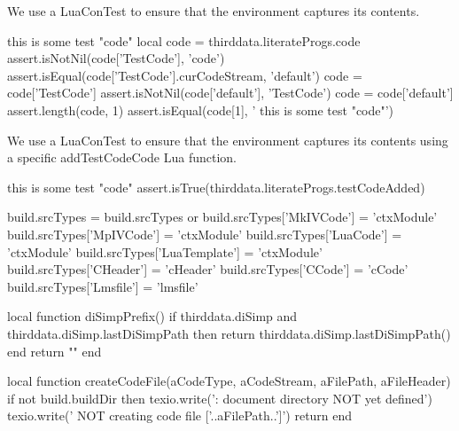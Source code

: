 \def\addMITLicense#1#2#3{
  \directlua{
    thirddata.literateProgs.addMITLicense('#1', '#2', '#3')
  }
}

\def\addApacheLicense#1#2#3{
  \directlua{
    thirddata.literateProgs.addApacheLicense('#1', '#2', '#3')
  }
}
\stopMkIVCode


We use a LuaConTest to ensure that the  environment 
captures its contents. 

\startConTest
\begingroup
  \startTestCode
    this is some test "code"
  \stopTestCode
  \startLuaConTest
    local code = thirddata.literateProgs.code
    assert.isNotNil(code['TestCode'], 'code')
    assert.isEqual(code['TestCode'].curCodeStream, 'default')
    code = code['TestCode']
    assert.isNotNil(code['default'], 'TestCode')
    code = code['default']
    assert.length(code, 1)
    assert.isEqual(code[1], '    this is some test "code"')
  \stopLuaConTest
\endgroup
\stopConTest
\stopTestCase


We use a LuaConTest to ensure that the  environment 
captures its contents using a specific addTestCodeCode Lua function. 

\startConTest
\begingroup
  \startTestCode
    this is some test "code"
  \stopTestCode
  \startLuaConTest
    assert.isTrue(thirddata.literateProgs.testCodeAdded)
  \stopLuaConTest
\endgroup
\stopConTest
\stopTestCase

\startLuaCode

build.srcTypes = build.srcTypes or { }
build.srcTypes['MkIVCode']    = 'ctxModule'
build.srcTypes['MpIVCode']    = 'ctxModule'
build.srcTypes['LuaCode']     = 'ctxModule'
build.srcTypes['LuaTemplate'] = 'ctxModule'
build.srcTypes['CHeader']     = 'cHeader'
build.srcTypes['CCode']       = 'cCode'
build.srcTypes['Lmsfile']     = 'lmsfile'

local function diSimpPrefix()
  if thirddata.diSimp and thirddata.diSimp.lastDiSimpPath then
    return thirddata.diSimp.lastDiSimpPath()
  end
  return ""
end

local function createCodeFile(aCodeType,
                              aCodeStream,
                              aFilePath,
                              aFileHeader)
  if not build.buildDir then
    texio.write('\nERROR: document directory NOT yet defined\n')
    texio.write('       NOT creating code file ['..aFilePath..']\n\n')
    return
  end

